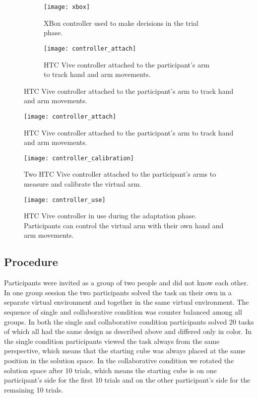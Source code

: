 \begin{figure}[h]
\centering
\begin{subfigure}{.5\textwidth}
  \texttt{[image: xbox]}
  \caption{XBox controller used to make decisions in the trial phase.} 
  \label{fig:xbox}
\end{subfigure}%
\begin{subfigure}{.5\textwidth}
  \texttt{[image: controller\_attach]}
  \caption{HTC Vive controller attached to the participant's arm to track hand and arm movements.}
  \label{fig:controller_attach}
\end{subfigure}%
\end{figure}

\begin{figure}[h]
\centering
\texttt{[image: controller\_attach]}
\caption{HTC Vive controller attached to the participant's arm to track hand and arm movements.}
\label{fig:controller_attach}
\end{figure}

\begin{figure}[h]
\centering
\texttt{[image: controller\_calibration]}
\caption{Two HTC Vive controller attached to the participant's arms to measure and calibrate the virtual arm.}
\label{fig:controller_attach}
\end{figure}

\begin{figure}[h]
\centering
\texttt{[image: controller\_use]}
\caption{HTC Vive controller in use during the adaptation phase. Participants can control the virtual arm with their own hand and arm movements.}
\label{fig:controller_attach}
\end{figure}

\newpage

\subsection{Procedure}
Participants were invited as a group of two people and did not know each other. In one group session the two participants solved the task on their own in a separate virtual environment and together in the same virtual environment. The sequence of single and collaborative condition was counter balanced among all groups. In both the single and collaborative condition participants solved 20 tasks of which all had the same design as described above and differed only in color. In the single condition participants viewed the task always from the same perspective, which means that the starting cube was always placed at the same position in the solution space.
In the collaborative condition we rotated the solution space after 10 trials, which means the starting cube is on one participant's side for the first 10 trials and on the other participant's side for the remaining 10 trials. 

